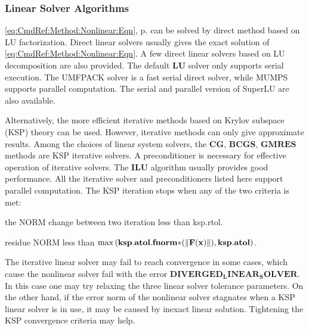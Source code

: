 \documentclass[oneside,12pt]{cgd_book}
\begin{document}
\subsubsection{Linear Solver Algorithms}
\eqref{eq:CmdRef:Method:Nonlinear:Eqn}, p. \pageref{eq:CmdRef:Method:Nonlinear:Eqn}
can be solved by direct method based on LU
          factorization. Direct linear solvers usually gives the exact solution of
\eqref{eq:CmdRef:Method:Nonlinear:Eqn}. A few direct linear solvers based on LU
          decomposition are also provided. The default $\mathbf{LU}$
solver only supports serial execution.
          The UMFPACK solver is a fast serial direct solver, while MUMPS supports parallel computation. The serial and
          parallel version of SuperLU are also available.
\par
Alternatively, the more efficient iterative methods based on Krylov subspace (KSP) theory can be used.
          However, iterative methods can only give approximate results. Among the choices of linear system solvers, the
$\mathbf{CG}$, $\mathbf{BCGS}$, $\mathbf{GMRES}$ methods are KSP iterative
          solvers. A preconditioner is necessary for effective operation of iterative solvers. The
$\mathbf{ILU}$ algorithm usually provides good performance. All the iterative solver and
          preconditioners listed here support parallel computation. The KSP iteration stops when any of the two criteria
          is met:
\par
\begin{compactitem}
\item the NORM change between two iteration less than ksp.rtol.
\par
\item residue NORM less than $\max\left({\bf ksp.atol.fnorm*}( \left\Vert {\bf F}({\bf
              x}) \right\Vert),{\bf ksp.atol} \right)$.
\par
\end{compactitem}
The iterative linear solver may fail to reach convergence in some cases, which cause the nonlinear
          solver fail with the error $\mathbf{DIVERGED_LINEAR_SOLVER}$. In this case one may try relaxing
          the three linear solver tolerance parameters. On the other hand, if the error norm of the nonlinear solver
          stagnates when a KSP linear solver is in use, it may be caused by inexact linear solution. Tightening the KSP
          convergence criteria may help.
\par
\end{document}
